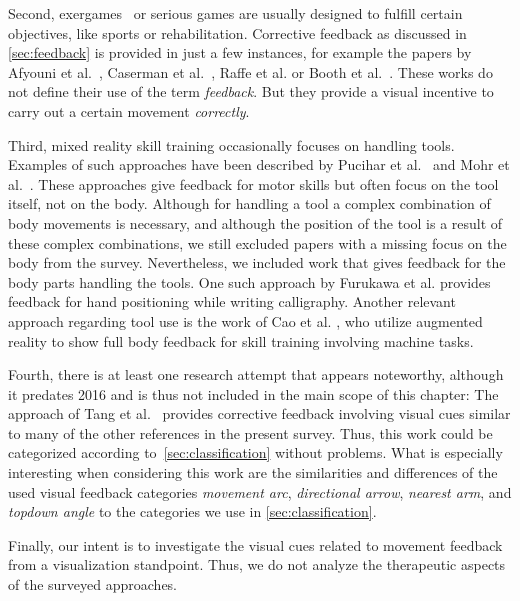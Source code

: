 Second, exergames~\cite{oh2010defining} or serious games are usually designed to fulfill certain objectives, like sports or rehabilitation. Corrective feedback as discussed in \autoref{sec:feedback} is provided in just a few instances, for example the papers by Afyouni et al.~\cite{afyouni2020arb}, Caserman et al.~\cite{caserman2021fbm}, Raffe et al. \cite{raffe2018cst} or Booth et al.~\cite{booth2019vue}. These works do not define their use of the term \emph{feedback}. But they provide a visual incentive to carry out a certain movement \emph{correctly}.

Third, mixed reality skill training occasionally focuses on handling tools. Examples of such approaches have been described by Pucihar et al.~\cite{pucihar2015dcm} and Mohr et al.~\cite{mohr2017rvt}. These approaches give feedback for motor skills but often focus on the tool itself, not on the body. Although for handling a tool a complex combination of body movements is necessary, and although the position of the tool is a result of these complex combinations, we still excluded papers with a missing focus on the body from the survey. Nevertheless, we included work that gives feedback for the body parts handling the tools. One such approach by Furukawa et al.\cite{furukawa2018dar} provides feedback for hand positioning while writing calligraphy. Another relevant approach regarding tool use is the work of Cao et al. \cite{cao2020esa}, who utilize augmented reality to show full body feedback for skill training involving machine tasks.

Fourth, there is at least one research attempt that appears noteworthy, although it predates 2016 and is thus not included in the main scope of this chapter: The approach of Tang et al.~\cite{tang2015pah} provides corrective feedback involving visual cues similar to many of the other references in the present survey. Thus, this work could be categorized according to~\autoref{sec:classification} without problems. What is especially interesting when considering this work are the similarities and differences of the used visual feedback categories \emph{movement arc}, \emph{directional arrow}, \emph{nearest arm}, and \emph{topdown angle} to the categories we use in \autoref{sec:classification}.


Finally, our intent is to investigate the visual cues related to movement feedback from a visualization standpoint. Thus, we do not analyze the therapeutic aspects of the surveyed approaches.

